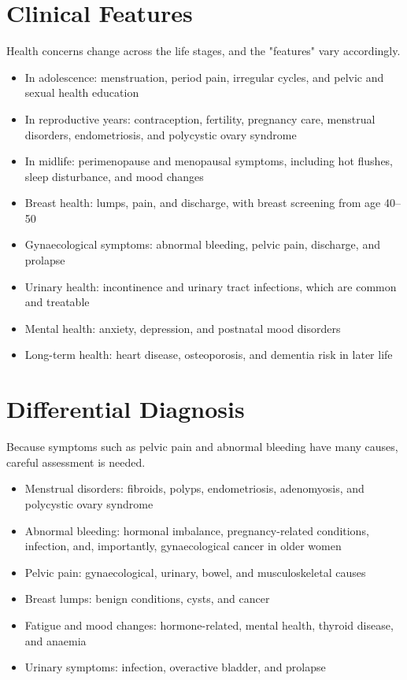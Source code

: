 \section*{Clinical Features}
Health concerns change across the life stages, and the "features" vary accordingly.
\begin{itemize}
    \item In adolescence: menstruation, period pain, irregular cycles, and pelvic and sexual health education
    \item In reproductive years: contraception, fertility, pregnancy care, menstrual disorders, endometriosis, and polycystic ovary syndrome
    \item In midlife: perimenopause and menopausal symptoms, including hot flushes, sleep disturbance, and mood changes
    \item Breast health: lumps, pain, and discharge, with breast screening from age 40--50
    \item Gynaecological symptoms: abnormal bleeding, pelvic pain, discharge, and prolapse
    \item Urinary health: incontinence and urinary tract infections, which are common and treatable
    \item Mental health: anxiety, depression, and postnatal mood disorders
    \item Long-term health: heart disease, osteoporosis, and dementia risk in later life
\end{itemize}

\section*{Differential Diagnosis}
Because symptoms such as pelvic pain and abnormal bleeding have many causes, careful assessment is needed.
\begin{itemize}
    \item Menstrual disorders: fibroids, polyps, endometriosis, adenomyosis, and polycystic ovary syndrome
    \item Abnormal bleeding: hormonal imbalance, pregnancy-related conditions, infection, and, importantly, gynaecological cancer in older women
    \item Pelvic pain: gynaecological, urinary, bowel, and musculoskeletal causes
    \item Breast lumps: benign conditions, cysts, and cancer
    \item Fatigue and mood changes: hormone-related, mental health, thyroid disease, and anaemia
    \item Urinary symptoms: infection, overactive bladder, and prolapse
\end{itemize}

